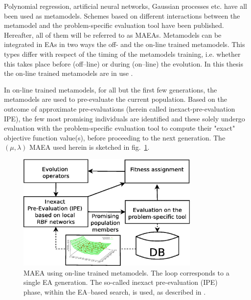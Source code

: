 Polynomial regression, artificial neural networks, Gaussian processes etc. have all been used as metamodels.  Schemes based on different interactions between the metamodel and the problem-specific evaluation tool have been published. Hereafter, all of them will be referred to as MAEAs. Metamodels can be integrated in EAs in two ways the off- and the on-line trained metamodels. This types differ with respect of the timing of the metamodels training, i.e. whether this takes place before (off–line) or during (on–line) the evolution. In this thesis the on-line trained metamodels are in use \cite{LTT_2_018,LTT_2_029}. 
 
In on-line trained metamodels, for all but the first few generations, the metamodels are used to pre-evaluate the current population. Based on the outcome of approximate pre-evaluations (herein called inexact-pre-evaluation IPE), the few most promising individuals are identified and these solely undergo evaluation with the problem-specific evaluation tool to compute their "exact" objective function value(s), before proceeding to the next generation. The $(\mu,\lambda)$ MAEA used herein is sketched in fig.~\ref{MAEA}.


\begin{figure}[h!]
\centering
\includegraphics[width=90mm]{MAEA.eps} 
\caption{MAEA using on-line trained metamodels. The loop corresponds to a single EA generation. The so-called inexact pre-evaluation (IPE) phase, within the EA--based search, is used, as described in \cite{LTT_2_020,LTT_2_029}. }
\label{MAEA}
\end{figure}


